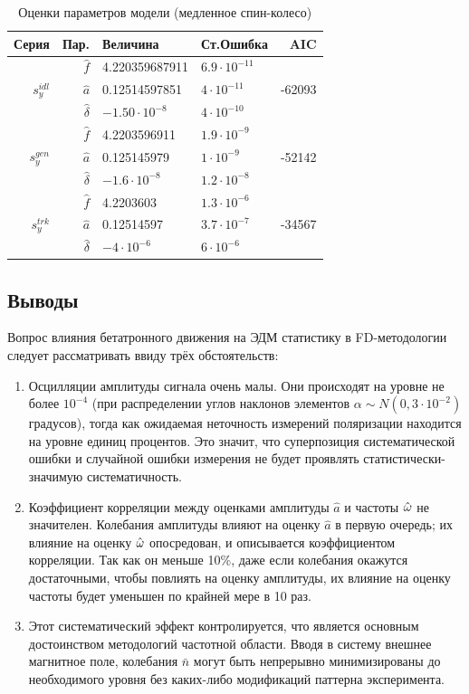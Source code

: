 \begin{table}[h]\centering\captionsetup{width=.65\linewidth}
	\caption{Оценки параметров модели (медленное спин-колесо)\label{tbl:param_estimates}}
	\begin{tabular}{r|rllr}
		\toprule
		Серия & Пар. & Величина & Ст.Ошибка & AIC \\
		\midrule
		\multirow{3}{*}{$s_y^{idl}$}
		& $\hat f$ & 4.220359687911 & $6.9\cdot10^{-11}$ & \multirow{3}{*}{-62093} \\
		& $\hat a$ & 0.12514597851 & $4\cdot10^{-11}$ & \\
		& $\hat\delta$ & $-1.50\cdot10^{-8}$ & $4\cdot 10^{-10}$ &\\
		\hline
		\multirow{3}{*}{$s_y^{gen}$}
		& $\hat f$ & 4.2203596911 & $1.9\cdot 10^{-9}$ & \multirow{3}{*}{-52142} \\
		& $\hat a$ & 0.125145979 & $1\cdot 10^{-9}$ & \\
		& $\hat\delta$ & $-1.6\cdot 10^{-8}$ & $1.2\cdot 10^{-8}$ &\\
		\hline
		\multirow{3}{*}{$s_y^{trk}$}
		& $\hat f$ & 4.2203603 & $1.3\cdot 10^{-6}$ & \multirow{3}{*}{-34567} \\
		& $\hat a$ & 0.12514597 & $3.7\cdot10^{-7}$ & \\
		& $\hat\delta$ & $-4\cdot10^{-6}$ & $6\cdot 10^{-6}$ &\\
		\bottomrule
	\end{tabular}
\end{table}

\subsection{Выводы}
Вопрос влияния бетатронного движения на ЭДМ статистику в FD-методологии следует рассматривать
ввиду трёх обстоятельств:
\begin{enumerate}
\item Осцилляции амплитуды сигнала очень малы. Они происходят на уровне не более $10^{-4}$ (при
	распределении углов наклонов элементов 
  ${\alpha\sim N(0, 3\cdot 10^{-2})}$ градусов), тогда как ожидаемая неточность измерений поляризации находится
  на уровне единиц процентов. Это значит, что суперпозиция систематической ошибки 
  и случайной ошибки измерения
  не будет проявлять статистически-значимую систематичность.
\item Коэффициент корреляции между оценками амплитуды $\hat a$ и частоты $\hat{\omega}$ не значителен. 
	Колебания амплитуды
  влияют на оценку $\hat a$ в первую очередь; их влияние на оценку $\hat{\omega}$ опосредован, и описывается
  коэффициентом корреляции. Так как он меньше 10\%, даже если колебания окажутся достаточными, чтобы повлиять
  на оценку амплитуды, их влияние на оценку частоты будет уменьшен по крайней мере в 10 раз.
\item Этот систематический эффект контролируется, что является основным достоинством методологий
  частотной области. Вводя в систему внешнее магнитное поле, колебания $\bar n$ могут быть 
  непрерывно минимизированы  до необходимого уровня без каких-либо модификаций паттерна эксперимента.
\end{enumerate}
